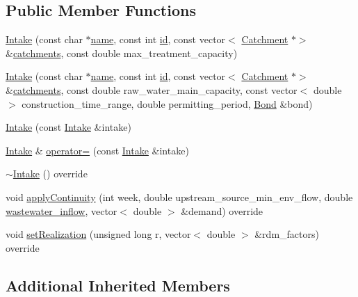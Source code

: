 \subsection*{Public Member Functions}
\begin{DoxyCompactItemize}
\item 
\mbox{\hyperlink{classIntake_a02e01801fcaede46e960d497e60eb335}{Intake}} (const char $\ast$\mbox{\hyperlink{classWaterSource_a846ea74c5b453d014f594d41fee8c765}{name}}, const int \mbox{\hyperlink{classWaterSource_a6eafe5dfefd317877d1244e8a7c6e742}{id}}, const vector$<$ \mbox{\hyperlink{classCatchment}{Catchment}} $\ast$$>$ \&\mbox{\hyperlink{classWaterSource_a8c18c34f23f8a06685c1d12f462ed830}{catchments}}, const double max\+\_\+treatment\+\_\+capacity)
\item 
\mbox{\hyperlink{classIntake_a41f51ae340129c31a4b2067c9f8ca0f9}{Intake}} (const char $\ast$\mbox{\hyperlink{classWaterSource_a846ea74c5b453d014f594d41fee8c765}{name}}, const int \mbox{\hyperlink{classWaterSource_a6eafe5dfefd317877d1244e8a7c6e742}{id}}, const vector$<$ \mbox{\hyperlink{classCatchment}{Catchment}} $\ast$$>$ \&\mbox{\hyperlink{classWaterSource_a8c18c34f23f8a06685c1d12f462ed830}{catchments}}, const double raw\+\_\+water\+\_\+main\+\_\+capacity, const vector$<$ double $>$ construction\+\_\+time\+\_\+range, double permitting\+\_\+period, \mbox{\hyperlink{classBond}{Bond}} \&bond)
\item 
\mbox{\hyperlink{classIntake_aa81e2e35940482717fa67c33b6acd002}{Intake}} (const \mbox{\hyperlink{classIntake}{Intake}} \&intake)
\item 
\mbox{\hyperlink{classIntake}{Intake}} \& \mbox{\hyperlink{classIntake_a41ce62d29c93527b4db7c7ab28ba46f1}{operator=}} (const \mbox{\hyperlink{classIntake}{Intake}} \&intake)
\item 
\mbox{\hyperlink{classIntake_abf57ff6edf55f292921fb7838059ad26}{$\sim$\+Intake}} () override
\item 
void \mbox{\hyperlink{classIntake_acd5ab74c4091b286e69ecdcc495d83ce}{apply\+Continuity}} (int week, double upstream\+\_\+source\+\_\+min\+\_\+env\+\_\+flow, double \mbox{\hyperlink{classWaterSource_aeb5a2d2d83383a70ca20f3e94635a9c7}{wastewater\+\_\+inflow}}, vector$<$ double $>$ \&demand) override
\item 
void \mbox{\hyperlink{classIntake_a879c4c780a4d21606e848f57464cf3b6}{set\+Realization}} (unsigned long r, vector$<$ double $>$ \&rdm\+\_\+factors) override
\end{DoxyCompactItemize}
\subsection*{Additional Inherited Members}


